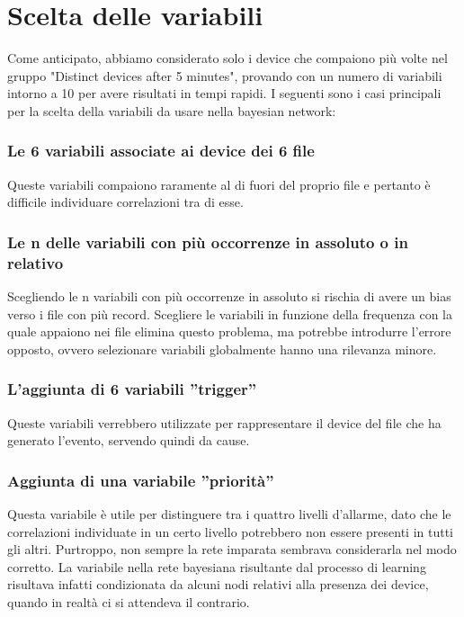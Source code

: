 \documentclass[a4paper]{article}
\begin{document}
\section*{Scelta delle variabili}
Come anticipato, abbiamo considerato solo i device che compaiono più volte nel gruppo "Distinct devices after 5 minutes", provando con un numero  di variabili intorno a 10 per avere risultati in tempi rapidi. I seguenti sono i casi principali per la scelta della variabili da usare nella bayesian network:

\subsubsection*{Le 6 variabili associate ai device dei 6 file}
Queste variabili compaiono raramente al di fuori del proprio file e pertanto è difficile individuare correlazioni tra di esse.

\subsubsection*{Le n delle variabili con più occorrenze in assoluto o in relativo}
Scegliendo le n variabili con più occorrenze in assoluto si rischia di avere un bias verso i file con più record. Scegliere le variabili in funzione della frequenza con la quale appaiono nei file elimina questo problema, ma potrebbe introdurre l'errore opposto, ovvero selezionare variabili globalmente hanno una rilevanza minore.

\subsubsection*{L'aggiunta di 6 variabili ''trigger''}
Queste variabili verrebbero utilizzate per rappresentare il device del file che ha generato l'evento, servendo quindi da cause.

\subsubsection*{Aggiunta di una variabile ''priorità''}
Questa variabile è utile per distinguere tra i quattro livelli d'allarme, dato che le correlazioni individuate in un certo livello potrebbero non essere presenti in tutti gli altri. Purtroppo, non sempre la rete imparata sembrava considerarla nel modo corretto. La variabile nella rete bayesiana risultante dal processo di learning risultava infatti condizionata da alcuni nodi relativi alla presenza dei device, quando in realtà ci si attendeva il contrario.
\end{document}
